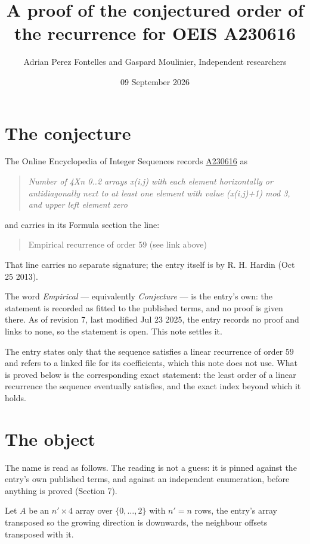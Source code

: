 \documentclass[11pt]{article}
\title{A proof of the conjectured order of the recurrence for OEIS A230616}
\author{Adrian Perez Fontelles and Gaspard Moulinier, Independent researchers}
\date{09 September 2026}
\theoremstyle{definition}
\begin{document}
\maketitle
\section{The conjecture}

The Online Encyclopedia of Integer Sequences records \href{https://oeis.org/A230616}{A230616} as

\begin{quote}\itshape Number of 4Xn 0..2 arrays x(i,j) with each element horizontally or antidiagonally next to at least one element with value (x(i,j)+1) mod 3, and upper left element zero\end{quote}

and carries in its Formula section the line:

\begin{quote}\ttfamily Empirical recurrence of order 59 (see link above)\end{quote}

That line carries no separate signature; the entry itself is by R. H. Hardin (Oct 25 2013).

The word {\itshape Empirical} --- equivalently {\itshape Conjecture} --- is the entry's own: the statement is recorded as fitted to the published terms, and no proof is given there. As of revision 7, last modified Jul 23 2025, the entry records no proof and links to none, so the statement is open. This note settles it.

The entry states only that the sequence satisfies a linear recurrence of order $59$ and refers to a linked file for its coefficients, which this note does not use. What is proved below is the corresponding exact statement: the least order of a linear recurrence the sequence eventually satisfies, and the exact index beyond which it holds.

\section{The object}

The name is read as follows. The reading is not a guess: it is pinned against the entry's own published terms, and against an independent enumeration, before anything is proved (Section 7).

Let $A$ be an $n' \times 4$ array over $\{0,\dots,2\}$ with $n' = n$ rows, the entry's array transposed so the growing direction is downwards, the neighbour offsets transposed with it.
\end{document}
